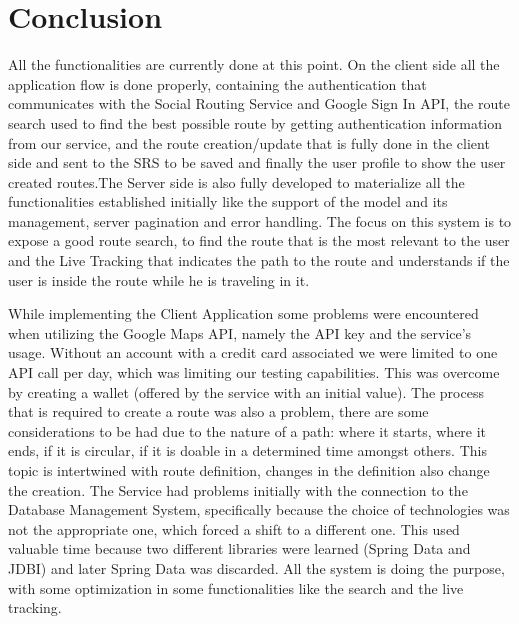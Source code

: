 \chapter{Conclusion}
All the functionalities are currently done at this point. On the client side all the application flow is done properly, containing the authentication
that communicates with the Social Routing Service and Google Sign In API, the route search used to find the best possible route by getting 
authentication information from our service, and the route creation/update that is fully done in the client side and sent to the SRS to be 
saved and finally the user profile to show the user created routes.The Server side is also fully developed to materialize all the 
functionalities established initially like the support of the model and its management, server pagination and error handling. 
The focus on this system is to expose a good route search, to find the route that is the most relevant to the user and the Live Tracking that 
indicates the path to the route and understands if the user is inside the route while he is traveling in it.

While implementing the Client Application some problems were encountered when utilizing the Google Maps API, namely the API key and the 
service's usage. Without an account with a credit card associated we were limited to one API call per day, which was limiting our testing 
capabilities. This was overcome by creating a wallet (offered by the service with an initial value). The process that is required to create 
a route was also a problem, there are some considerations to be had due to the nature of a path: where it starts, where it ends, if it is 
circular, if it is doable in a determined time amongst others. This topic is intertwined with route definition, changes in the definition 
also change the creation. The Service had problems initially with the connection to the Database Management System, specifically because 
the choice of technologies was not the appropriate one, which forced a shift to a different one. This used valuable time because two different 
libraries were learned (Spring Data and JDBI) and later Spring Data was discarded. All the system is doing the purpose, with some optimization 
in some functionalities like the search and the live tracking. 